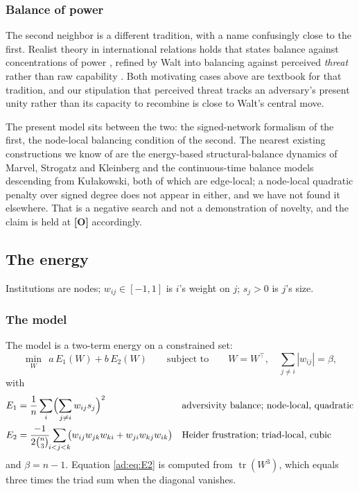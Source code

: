 \documentclass[11pt]{article}
\numberwithin{equation}{section}
\theoremstyle{plain}
\theoremstyle{definition}
\theoremstyle{remark}
\begin{document}
\subsubsection{Balance of power}\label{ad:subsub:realism}

The second neighbor is a different tradition, with a name confusingly
close to the first. Realist theory in international relations holds
that states balance against concentrations of power \cite{Wal79},
refined by Walt into balancing against perceived \emph{threat} rather
than raw capability \cite{Wal87}. Both motivating cases above are textbook for
that tradition, and our stipulation that perceived threat
tracks an adversary's present unity rather than its capacity to
recombine is close to Walt's central move.

The present model sits between the two: the signed-network formalism of
the first, the node-local balancing condition of the second. The nearest
existing constructions we know of are the energy-based structural-balance
dynamics of Marvel, Strogatz and Kleinberg and the continuous-time
balance models descending from Ku{\l}akowski, both of which are
edge-local; a node-local quadratic penalty over signed degree does not
appear in either, and we have not found it elsewhere. That is a negative
search and not a demonstration of novelty, and the claim is held at
\textbf{[O]} accordingly.

\subsection{The energy}\label{ad:sub:energy}

Institutions are nodes; $w_{ij}\in[-1,1]$ is $i$'s weight on $j$;
$s_j>0$ is $j$'s size.

\subsubsection{The model}\label{ad:subsub:constrained}

The model is a two-term energy on a constrained set:
\begin{equation}\label{ad:eq:model}
\min_{W}\ \ a\,E_1(W)+b\,E_2(W)
\qquad\text{subject to}\qquad
W=W^{\!\top},\quad \sum_{j\ne i}|w_{ij}|=\beta ,
\end{equation}
with
\begin{align}
E_1&=\frac1n\sum_i\Bigl(\sum_{j\ne i}w_{ij}s_j\Bigr)^{2}
&&\text{adversivity balance; node-local, quadratic}\label{ad:eq:E1}\\
E_2&=\frac{-1}{2\binom n3}\!\!\sum_{i<j<k}\!\!
\bigl(w_{ij}w_{jk}w_{ki}+w_{ji}w_{kj}w_{ik}\bigr)
&&\text{Heider frustration; triad-local, cubic}\label{ad:eq:E2}
\end{align}
and $\beta=n-1$. Equation \eqref{ad:eq:E2} is computed from
$\operatorname{tr}(W^{3})$, which equals three times the triad sum when
the diagonal vanishes.
\end{document}
